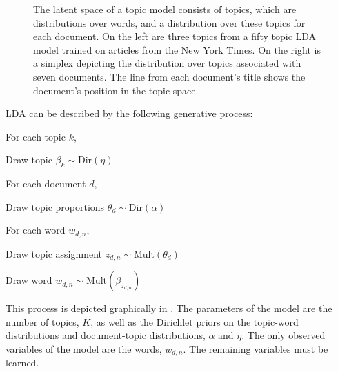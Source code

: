 \begin{figure}[t]
{  \label{fig:nyttopics:doc}
}
\caption{The latent space of a topic model consists of topics,
  which are distributions over words, and a distribution over these
  topics for each document.  On the left are three topics from a
  fifty topic LDA model trained on articles from the New York
  Times.  On the right is a simplex depicting the distribution
  over topics associated with seven documents.  The line from each
  document's title shows the document's position in the topic
  space.}
\label{fig:nyttopics:big}
\end{figure}

LDA can be described by the following generative process:
\begin{enumerate*}
  \item For each topic $k$, 
    \begin{enumerate*}
    \item Draw topic $\beta_k \sim \mathrm{Dir}(\eta)$
    \end{enumerate*}
  \item For each document $d$, 
    \begin{enumerate*}
    \item Draw topic proportions $\theta_d \sim \mathrm{Dir}(\alpha)$
    \item For each word $w_{d, n}$, 
      \begin{enumerate*}
      \item Draw topic assignment $z_{d,n} \sim \mathrm{Mult}(\theta_d)$
      \item Draw word $w_{d,n} \sim \mathrm{Mult}(\beta_{z_{d,n}})$
      \end{enumerate*}
    \end{enumerate*}
\end{enumerate*}
This process is depicted graphically in .  The
parameters of the model are the number of topics, $K$, as well as the
Dirichlet priors on the topic-word distributions and document-topic
distributions, $\alpha$ and $\eta$.  The only observed variables of
the model are the words, $w_{d,n}$.  The remaining variables must be
learned.


